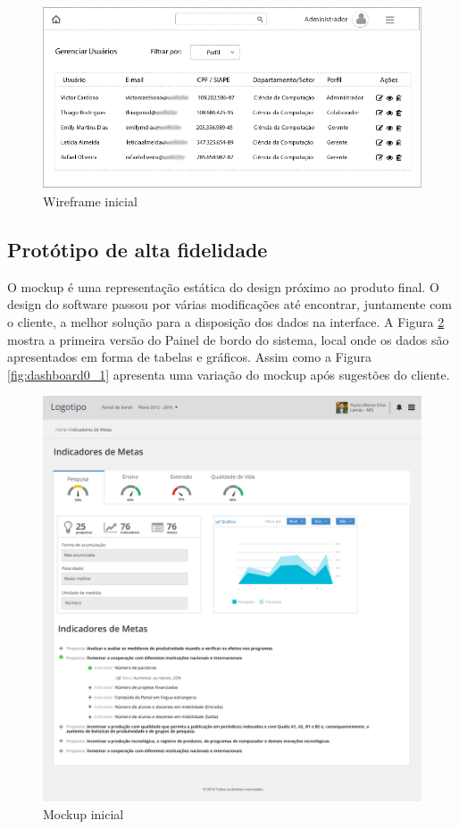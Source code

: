 \begin{figure}[H]
\centering
\includegraphics[width=1\textwidth]{images/wireframe.png}
\caption{Wireframe inicial}
\label{fig:wireframe}
\end{figure}

\subsection{Protótipo de alta fidelidade}
O mockup é uma representação estática do design próximo ao produto final. O design do software passou por várias modificações até encontrar, juntamente com o cliente, a melhor solução para a disposição dos dados na interface. A Figura \ref{fig:dashboard0} mostra a primeira versão do Painel de bordo do sistema, local onde os dados são apresentados em forma de tabelas e gráficos. Assim como a Figura \ref{fig:dashboard0_1} apresenta uma variação do mockup após sugestões do cliente. 

\begin{figure}[H]
\centering
\includegraphics[width=1\textwidth]{images/dashboard0.png}
\caption{Mockup inicial}
\label{fig:dashboard0}
\end{figure}


